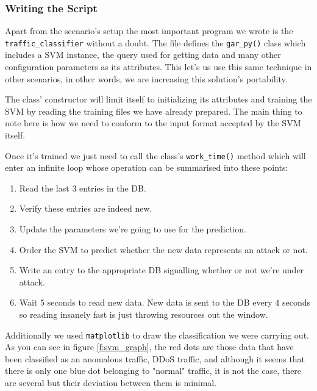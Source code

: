 \documentclass[12pt]{report}
\newcommand{\newpar} {
    \vskip 1cm
}
\begin{document}
			\subsubsection{Writing the Script}
				Apart from the scenario's setup the most important program we wrote is the \texttt{traffic\_classifier} without a doubt. The file defines the \texttt{gar\_py()} class which includes a SVM instance, the query used for getting data and many other configuration parameters as its attributes. This let's us use this same technique in other scenarios, in other words, we are increasing this solution's portability.
				\newpar
				The class' constructor will limit itself to initializing its attributes and training the SVM by reading the training files we have already prepared. The main thing to note here is how we need to conform to the input format accepted by the SVM itself.
				\newpar
				Once it's trained we just need to call the class's \texttt{work\_time()} method which will enter an infinite loop whose operation can be summarised into these points:

				\begin{enumerate}
					\item Read the last 3 entries in the DB.
					\item Verify these entries are indeed new.
					\item Update the parameters we're going to use for the prediction.
					\item Order the SVM to predict whether the new data represents an attack or not.
					\item Write an entry to the appropriate DB signalling whether or not we're under attack.
					\item Wait 5 seconds to read new data. New data is sent to the DB every 4 seconds so reading insanely fast is just throwing resources out the window.
				\end{enumerate}

				Additionally we used \texttt{matplotlib} to draw the classification we were carrying out. As you can see in figure \ref{f:svm_graph}, the red dots are those data that have been classified as an anomalous traffic, DDoS traffic, and although it seems that there is only one blue dot belonging to "normal" traffic, it is not the case, there are several but their deviation between them is minimal.
\end{document}

